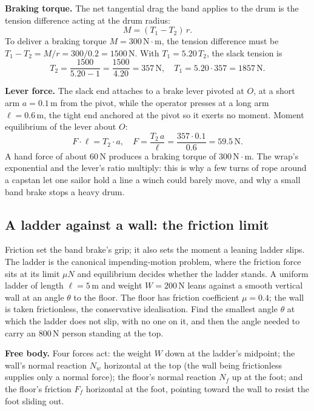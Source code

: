 

\textbf{Braking torque.} The net tangential drag the band applies to the
drum is the tension difference acting at the drum radius:
\[
M = (T_1 - T_2)\, r.
\]
To deliver a braking torque $M = 300\,\text{N}\cdot\text{m}$, the tension
difference must be $T_1 - T_2 = M/r = 300/0.2 = 1500\,\text{N}$. With
$T_1 = 5.20\, T_2$, the slack tension is
\[
T_2 = \frac{1500}{5.20 - 1} = \frac{1500}{4.20} = 357\,\text{N},
\quad T_1 = 5.20 \cdot 357 = 1857\,\text{N}.
\]

\textbf{Lever force.} The slack end attaches to a brake lever pivoted at
$O$, at a short arm $a = 0.1\,\si{\meter}$ from the pivot, while the
operator presses at a long arm $\ell = 0.6\,\si{\meter}$, the tight end
anchored at the pivot so it exerts no moment. Moment equilibrium of the
lever about $O$:
\[
F \cdot \ell = T_2 \cdot a, \quad
F = \frac{T_2\, a}{\ell} = \frac{357 \cdot 0.1}{0.6} = 59.5\,\text{N}.
\]
A hand force of about $60\,\text{N}$ produces a braking torque of
$300\,\text{N}\cdot\text{m}$. The wrap's exponential and the lever's ratio
multiply: this is why a few turns of rope around a capstan let one sailor
hold a line a winch could barely move, and why a small band brake stops a
heavy drum.

\subsection{A ladder against a wall: the friction limit}

Friction set the band brake's grip; it also sets the moment a leaning
ladder slips. The ladder is the canonical impending-motion problem, where
the friction force sits at its limit $\mu N$ and equilibrium decides whether
the ladder stands. A uniform ladder of length $\ell = 5\,\si{\meter}$ and
weight $W = 200\,\text{N}$ leans against a smooth vertical wall at an angle
$\theta$ to the floor. The floor has friction coefficient $\mu = 0.4$; the
wall is taken frictionless, the conservative idealisation. Find the smallest
angle $\theta$ at which the ladder does not slip, with no one on it, and then
the angle needed to carry an $800\,\text{N}$ person standing at the top.

\textbf{Free body.} Four forces act: the weight $W$ down at the ladder's
midpoint; the wall's normal reaction $N_w$ horizontal at the top (the wall
being frictionless supplies only a normal force); the floor's normal
reaction $N_f$ up at the foot; and the floor's friction $F_f$ horizontal at
the foot, pointing toward the wall to resist the foot sliding out.

